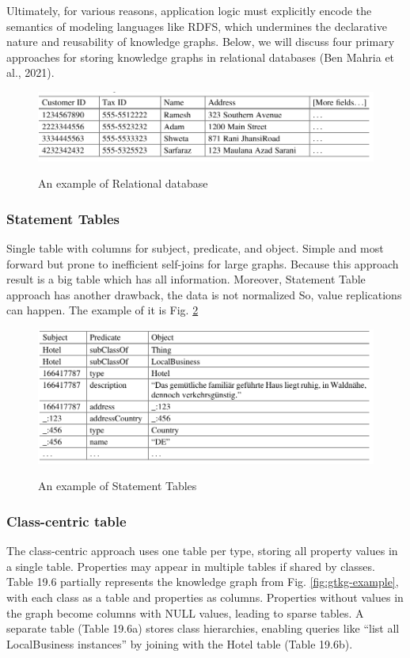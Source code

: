 \documentclass[12pt]{article}
\begin{document}
Ultimately, for various reasons, application logic must explicitly encode the semantics of modeling languages like RDFS, which undermines the declarative nature and reusability of knowledge graphs. Below, we will discuss four primary approaches for storing knowledge graphs in relational databases (Ben Mahria et al., 2021).

\begin{figure}
    \includegraphics[width=\linewidth]{imgs/rd-example.jpeg}
    \label{fig:rd-example}
    \caption{An example of Relational database}
\end{figure}

\subsubsection{Statement Tables}
Single table with columns for subject, predicate, and object. Simple and most forward but
prone to inefficient self-joins for large graphs. Because this approach result is a big table
which has all information. Moreover, Statement Table approach has another drawback,
the data is not normalized So, value replications can happen. The example of it is Fig. \ref{fig:Statement-Tables-example}

\begin{figure}
    \includegraphics[width=\linewidth]{imgs/Statement table.jpeg}
    \label{fig:Statement-Tables-example}
    \caption{An example of Statement Tables }
\end{figure}

\subsubsection{Class-centric table}
The class-centric approach uses one table per type, storing all property values in a single table. Properties may appear in multiple tables if shared by classes. Table 19.6 partially represents the knowledge graph from Fig. \ref{fig:gtkg-example}, with each class as a table and properties as columns. Properties without values in the graph become columns with NULL values, leading to sparse tables. A separate table (Table 19.6a) stores class hierarchies, enabling queries like “list all LocalBusiness instances” by joining with the Hotel table (Table 19.6b).
\end{document}
